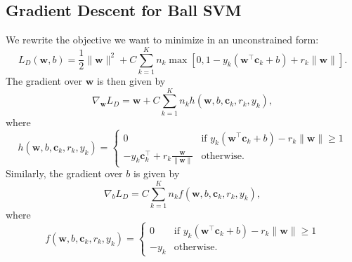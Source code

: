 \documentclass[12pt]{article}
\newcommand{\bc}{\mathbf{c}}
\newcommand{\bw}{\mathbf{w}}
\newcommand{\tx}{\tilde{x}}
\begin{document}
\subsection{Gradient Descent for Ball SVM}
We rewrite the objective we want to minimize in an unconstrained form:
\begin{equation}
L_D(\bw, b) = \frac{1}{2}\|\bw\|^2 + C\sum_{k=1}^Kn_k\max[0, 1 - y_k(\bw^{\top}\bc_k +b) + r_k\| \bw \|].
\end{equation}
The gradient over $\bw$ is then given by
$$
\nabla_{\bw} L_D = \bw + C\sum_{k=1}^K n_k h(\bw, b, \bc_k, r_k, y_k),
$$
where
$$
h(\bw, b, \bc_k, r_k, y_k) = 
  \begin{cases}
   0 & \text{if } y_k(\bw^{\top}\bc_k +b) - r_k\| \bw \| \ge 1  \\
   -y_k\bc_k^{\top} + r_k\frac{\bw}{\|\bw\|} & \text{otherwise}.
  \end{cases}
$$
Similarly, the gradient over $b$ is given by
$$
\nabla_{b} L_D = C\sum_{k=1}^K n_k f(\bw, b, \bc_k, r_k, y_k),
$$
where
$$
f(\bw, b, \bc_k, r_k, y_k) = 
  \begin{cases}
   0 & \text{if } y_k(\bw^{\top}\bc_k +b) - r_k\| \bw \| \ge 1  \\
   -y_k & \text{otherwise}.
  \end{cases}
$$

\end{document}

